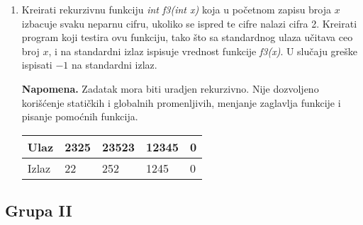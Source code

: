\begin{enumerate}
\item Kreirati rekurzivnu funkciju \emph{int f3(int x)} koja u po\v cetnom zapisu broja $x$ izbacuje svaku neparnu cifru, ukoliko se ispred te cifre nalazi cifra 2. Kreirati program koji testira ovu funkciju, tako \v sto sa standardnog ulaza u\v citava ceo broj $x$, i na standardni izlaz ispisuje vrednost funkcije \emph{f3(x)}. U slu\v caju gre\v ske ispisati $-1$ na standardni izlaz. 

\textbf{Napomena.} Zadatak mora biti uradjen rekurzivno. Nije dozvoljeno kori\v s\' cenje stati\v ckih i globalnih promenljivih, menjanje zaglavlja funkcije i pisanje pomo\' cnih funkcija. 

\small
\begin{tabular}{ |l|l|l|l|l| }
\hline 
  Ulaz  &  2325 &  23523 & 12345 & 0 \\ \hline 
  Izlaz &  22 & 252 & 1245  & 0 \\ \hline 
\end{tabular}
\normalsize
\end{enumerate}

\subsection{Grupa II}


